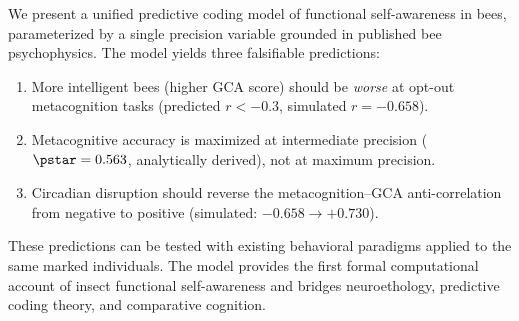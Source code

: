 We present a unified predictive coding model of functional self-awareness in bees, parameterized by
a single precision variable grounded in published bee psychophysics. The model yields three falsifiable
predictions:

\begin{enumerate}
  \item More intelligent bees (higher GCA score) should be \emph{worse} at opt-out metacognition
    tasks (predicted $r < -0.3$, simulated $r = -0.658$).
  \item Metacognitive accuracy is maximized at intermediate precision ($\pstar = 0.563$, analytically
    derived), not at maximum precision.
  \item Circadian disruption should reverse the metacognition--GCA anti-correlation from negative
    to positive (simulated: $-0.658 \to +0.730$).
\end{enumerate}

These predictions can be tested with existing behavioral paradigms applied to the same marked
individuals. The model provides the first formal computational account of insect functional
self-awareness and bridges neuroethology, predictive coding theory, and comparative cognition.
